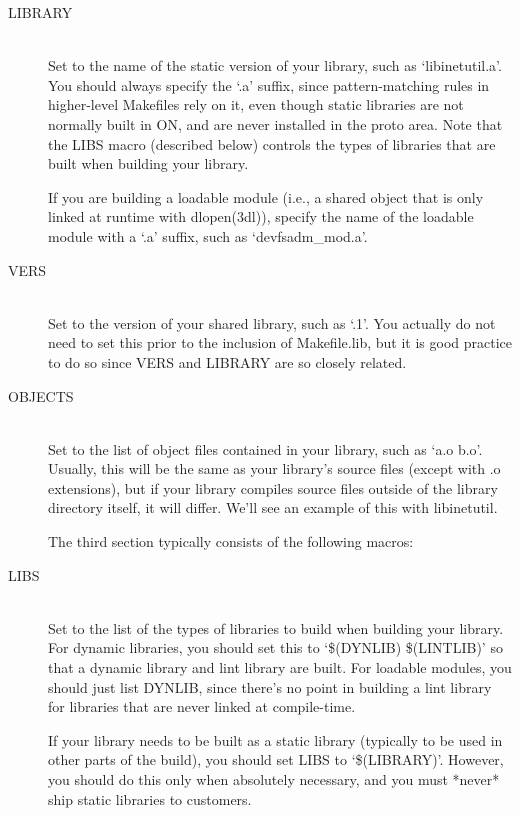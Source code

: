 \documentclass{article}
\begin{document}
\begin{description}
\item[LIBRARY] \hfill \\
  Set to the name of the static version of your library, such as
  `libinetutil.a'. You should always specify the `.a' suffix, since
  pattern-matching rules in higher-level Makefiles rely on it, even though
  static libraries are not normally built in ON, and are never installed in the
  proto area. Note that the LIBS macro (described below) controls the types of
  libraries that are built when building your library.

  If you are building a loadable module (i.e., a shared object that is only
  linked at runtime with dlopen(3dl)), specify the name of the loadable module
  with a `.a' suffix, such as `devfsadm\_mod.a'.

\item[VERS] \hfill \\
  Set to the version of your shared library, such as `.1'. You actually do not
  need to set this prior to the inclusion of Makefile.lib, but it is good
  practice to do so since VERS and LIBRARY are so closely related.

\item[OBJECTS] \hfill \\
  Set to the list of object files contained in your library, such as `a.o
  b.o'. Usually, this will be the same as your library's source files (except
  with .o extensions), but if your library compiles source files outside of the
  library directory itself, it will differ. We'll see an example of this with
  libinetutil.

  The third section typically consists of the following macros:

\item[LIBS] \hfill \\
  Set to the list of the types of libraries to build when building your
  library. For dynamic libraries, you should set this to `\$(DYNLIB) \$(LINTLIB)'
  so that a dynamic library and lint library are built. For loadable modules, you
  should just list DYNLIB, since there's no point in building a lint library for
  libraries that are never linked at compile-time.

  If your library needs to be built as a static library (typically to be used in
  other parts of the build), you should set LIBS to `\$(LIBRARY)'. However, you
  should do this only when absolutely necessary, and you must *never* ship static
  libraries to customers.


\end{description}
\end{document}
